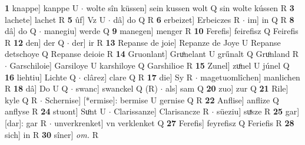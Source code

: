 \documentclass[8pt,a4paper,notitlepage]{article}
\begin{document}
\begin{table}[ht]
\begin{minipage}[t]{0.5\linewidth}
\textbf{1} knappe] kanppe U  $\cdot$ wolte sîn küssen] sein kussen wolt Q sin wolte kússen R \textbf{3} lachete] lachet R \textbf{5} ûf] Vz U  $\cdot$ dâ] do Q R \textbf{6} erbeizet] Erbeiczes R  $\cdot$ im] in Q R \textbf{8} dâ] do Q  $\cdot$ manegiu] werde Q \textbf{9} manegen] menger R \textbf{10} Ferefis] feirefisz Q Feirefis R \textbf{12} den] der Q  $\cdot$ der] ir R \textbf{13} Repanse de joie] Repanze de Joye U Repanse detschoye Q Repanse deioie R \textbf{14} Gruonlant] Gruͦnelant U grűnalt Q Gruͦnland R  $\cdot$ Garschiloie] Garsiloye U karshiloye Q Garshilioe R \textbf{15} Zunel] zuͦnel U júnel Q \textbf{16} liehtiu] Lichte Q  $\cdot$ clârez] clare Q R \textbf{17} die] Sy R  $\cdot$ magetuomlîchen] manlichen R \textbf{18} dâ] Do U Q  $\cdot$ swanc] swanckel Q (R)  $\cdot$ als] sam Q \textbf{20} zuo] zur Q \textbf{21} Rile] kyle Q R  $\cdot$ Schernise] [*ermise]: bermise U gernise Q R \textbf{22} Anflise] anflize Q anflyse R \textbf{24} stuont] Suͦnt U  $\cdot$ Clarissanze] Clarisancze R  $\cdot$ süeziu] suͯsze R \textbf{25} gar] [dar]: gar R  $\cdot$ unverkrenket] vn verklenket Q \textbf{27} Ferefis] feyrefisz Q Feriefis R \textbf{28} sich] in R \textbf{30} sîner] \textit{om.} R \newline
\end{minipage}
\end{table}
\end{document}

